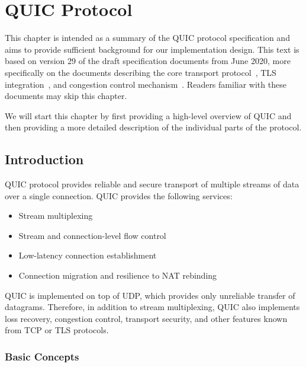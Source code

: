 \chapter{QUIC Protocol}\label{chap:02-quic}

This chapter is intended as a summary of the QUIC protocol specification and aims to provide
sufficient background for our implementation design. This text is based on version 29 of the draft
specification documents from June 2020, more specifically on the documents describing the core
transport protocol~\cite{draft-ietf-quic-transport}, TLS integration~\cite{draft-ietf-quic-tls}, and
congestion control mechanism~\cite{draft-ietf-quic-recovery}. Readers familiar with these documents
may skip this chapter.

We will start this chapter by first providing a high-level overview of QUIC and then providing a
more detailed description of the individual parts of the protocol.

\section{Introduction}

QUIC protocol provides reliable and secure transport of multiple streams of data over a single
connection. QUIC provides the following services:

\begin{itemize}

  \item Stream multiplexing

  \item Stream and connection-level flow control

  \item Low-latency connection establishment

  \item Connection migration and resilience to NAT rebinding

\end{itemize}

QUIC is implemented on top of UDP, which provides only unreliable transfer of datagrams. Therefore,
in addition to stream multiplexing, QUIC also implements loss recovery, congestion control,
transport security, and other features known from TCP or TLS protocols.

\subsection{Basic Concepts}

